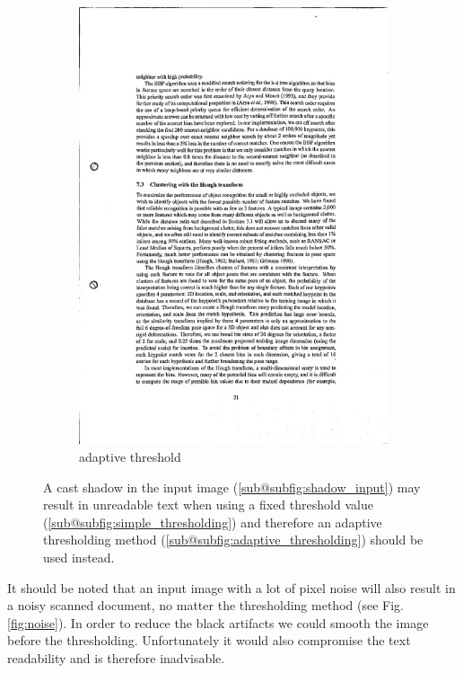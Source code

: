 \documentclass[bibliography=totoc]{scrartcl}
\begin{document}
\begin{figure}[H]
\begin{subfigure}[t]{0.28\linewidth}
		\includegraphics[width=\linewidth]{imgs/threshold/bad_lighting_adaptive.jpg}
		\caption{adaptive threshold}
		\label{subfig:adaptive_thresholding}
	\end{subfigure}
	\caption{A cast shadow in the input image (\ref{sub@subfig:shadow_input}) may result in unreadable text when using a fixed threshold value (\ref{sub@subfig:simple_thresholding}) and therefore an adaptive thresholding method  (\ref{sub@subfig:adaptive_thresholding}) should be used instead.}
	\label{fig:thresholding}
\end{figure}

It should be noted that an input image with a lot of pixel noise will also result in a noisy scanned document, no matter the thresholding method (see Fig. \ref{fig:noise}).
In order to reduce the black artifacts we could smooth the image before the thresholding.
Unfortunately it would also compromise the text readability and is therefore inadvisable.\\
\end{document}
